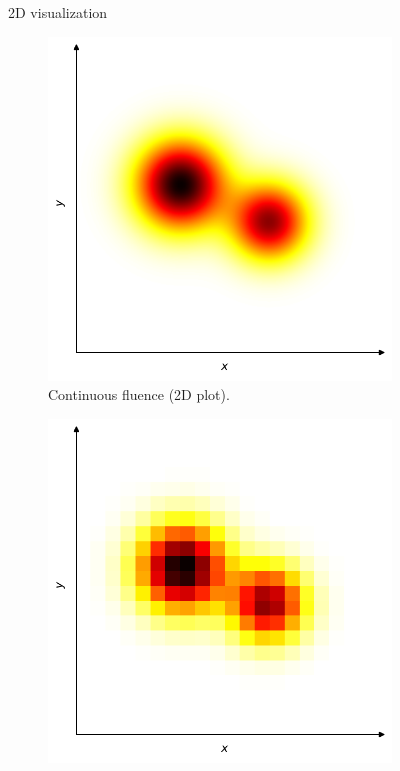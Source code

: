 \begin{figure}
	\centering
	2D visualization
	\\
	\begin{subfigure}[c]{0.45\textwidth}
		\includegraphics[width=\linewidth]{fluence_continuous_2D.pdf}
		\caption{Continuous fluence (2D plot).}
		\label{fig:fluence_bixel_2D_continuous}
	\end{subfigure}
	\begin{subfigure}[c]{0.45\textwidth}
		\includegraphics[width=\linewidth]{fluence_discrete_2D.pdf}

\end{subfigure}
\end{figure}
